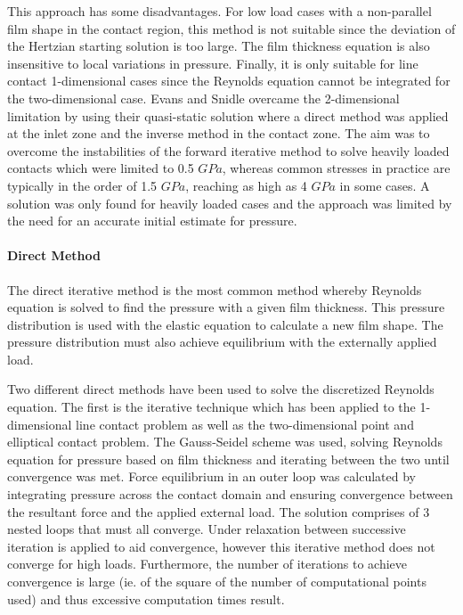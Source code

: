This approach has some disadvantages. For low load cases with a non-parallel film shape in the contact region, this method is not suitable since the deviation of the Hertzian starting solution is too large. The film thickness equation is also insensitive to local variations in pressure. Finally, it is only suitable for line contact 1-dimensional cases since the Reynolds equation cannot be integrated for the two-dimensional case. Evans and Snidle \cite{Evans1982} overcame the 2-dimensional limitation by using their quasi-static solution where a direct method was applied at the inlet zone and the inverse method in the contact zone. The aim was to overcome the instabilities of the forward iterative method to solve heavily loaded contacts which were limited to 0.5 $GPa$, whereas common stresses in practice are typically in the order of 1.5 $GPa$, reaching as high as 4 $GPa$ in some cases. A solution was only found for heavily loaded cases and the approach was limited by the need for an accurate initial estimate for pressure.

\paragraph{Direct Method}

The direct iterative method is the most common method whereby Reynolds equation is solved to find the pressure with a given film thickness. This pressure distribution is used with the elastic equation to calculate a new film shape. The pressure distribution must also achieve equilibrium with the externally applied load.

Two different direct methods have been used to solve the discretized Reynolds equation. The first is the iterative technique which has been applied to the 1-dimensional line contact problem \cite{Hamrock1984} as well as the two-dimensional point \cite{Hamrock1976a} and elliptical \cite{Chittenden1985} contact problem. The Gauss-Seidel scheme was used, solving Reynolds equation for pressure based on film thickness and iterating between the two until convergence was met. Force equilibrium in an outer loop was calculated by integrating pressure across the contact domain and ensuring convergence between the resultant force and the applied external load. The solution comprises of 3 nested loops that must all converge. Under relaxation between successive iteration is applied to aid convergence, however this iterative method does not converge for high loads. Furthermore, the number of iterations to achieve convergence is large (ie. of the square of the number of computational points used) and thus excessive computation times result.

